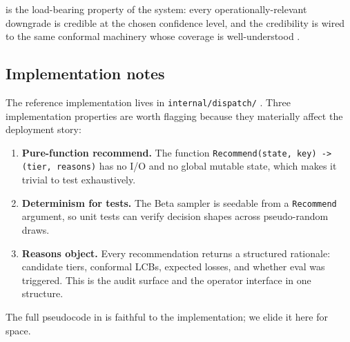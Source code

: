  is the load-bearing property of the system: every
operationally-relevant downgrade is credible at the chosen confidence
level, and the credibility is wired to the same conformal machinery whose
coverage is well-understood \cite{angelopoulos2021gentle}.

\subsection{Implementation notes}

The reference implementation lives in \texttt{internal/dispatch/}
\cite{german2026blackrim}. Three implementation properties are worth
flagging because they materially affect the deployment story:

\begin{enumerate}[leftmargin=*]
  \item \textbf{Pure-function recommend.} The function
        \texttt{Recommend(state, key) -> (tier, reasons)} has no I/O and no
        global mutable state, which makes it trivial to test exhaustively.
  \item \textbf{Determinism for tests.} The Beta sampler is seedable from a
        \texttt{Recommend} argument, so unit tests can verify decision shapes
        across pseudo-random draws.
  \item \textbf{Reasons object.} Every recommendation returns a structured
        rationale: candidate tiers, conformal LCBs, expected losses, and
        whether eval was triggered. This is the audit surface and the
        operator interface in one structure.
\end{enumerate}

The full pseudocode in
\cite{blackrim_moa1c} is faithful to the implementation; we elide it here
for space.
